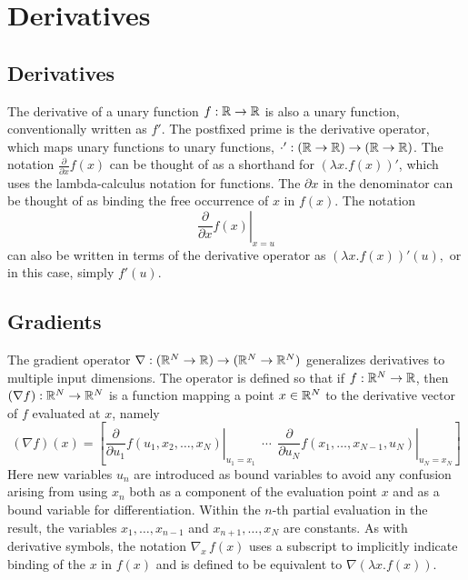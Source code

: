 \documentclass[10pt]{article}
\begin{document}
\clearpage
\appendix

\section{Derivatives}\label{derivative-definitions.section}

\subsection{Derivatives}

The derivative of a unary function $f:\mathbb{R} \rightarrow \mathbb{R}$ is
also a unary function, conventionally written as $f'$.  The postfixed prime is
the derivative operator, which maps unary functions to unary
functions, $\cdot' : \left(\mathbb{R} \rightarrow \mathbb{R}\right)
\rightarrow \left(\mathbb{R} \rightarrow \mathbb{R}\right)$.  The notation
$\frac{\partial}{\partial x} f(x)$ can be thought of as a shorthand
for $\left( \lambda x. f(x) \right)'$, which uses the lambda-calculus
notation for functions. The $\partial x$ in the denominator can be
thought of as binding the free occurrence of $x$ in $f(x)$.  The
notation
\[
\left. \frac{\partial}{\partial x} f(x) \right|_{x = u}
\]
can also be written in terms of the derivative operator as $\left(
  \lambda x. f(x) \right)'(u),$ or in this case, simply $f'(u)$.

\subsection{Gradients}

The gradient operator $\nabla:(\mathbb{R}^N \rightarrow \mathbb{R})\rightarrow
(\mathbb{R}^N \rightarrow \mathbb{R}^N)$ generalizes derivatives to multiple
input dimensions.  The operator is defined so that if
$f : \mathbb{R}^N \rightarrow \mathbb{R}$, then $(\nabla f):\mathbb{R}^N \rightarrow
\mathbb{R}^N$ is a function mapping a point $x \in \mathbb{R}^N$ to the
derivative vector of $f$ evaluated at $x$, namely
%
\[
(\nabla f)(x) 
= 
\left[
  \left. 
    \frac{\partial}{\partial u_1} f(u_1,x_2,\ldots,x_N)
  \right|_{u_1 = x_1}
  \ \ \cdots \ \ 
  \left. 
    \frac{\partial}{\partial u_N}  f(x_1,\ldots,x_{N-1},u_N)
   \right|_{u_N = x_N}
\right]
\]
%
Here new variables $u_n$ are introduced as bound variables to avoid
any confusion arising from using $x_n$ both as a component of the
evaluation point $x$ and as a bound variable for differentiation.
Within the $n$-th partial evaluation in the result, the variables
$x_1,\ldots,x_{n-1}$ and $x_{n+1},\ldots,x_N$ are constants.  As with
derivative symbols, the notation $\nabla_{\!x} \, f(x)$ uses a
subscript to implicitly indicate binding of the $x$ in $f(x)$ and is
defined to be equivalent to $\nabla(\lambda x. f(x))$.
\end{document}
